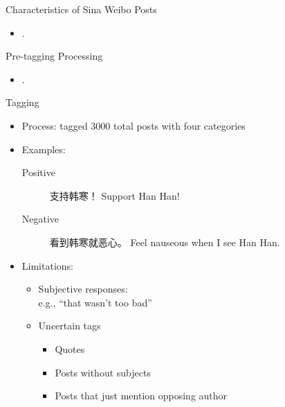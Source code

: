 \documentclass[12pt, trans]{beamer}
\newcommand{\1}[1]{{\mathbf 1}\left\{#1\right\}}        %
\begin{document}
\begin{frame}{Characteristics of Sina Weibo Posts}


\begin{itemize}[<+->]
\item  .
\end{itemize}

\end{frame}

\begin{frame}{Pre-tagging Processing}

\begin{itemize}[<+->]
\item  .
\end{itemize}

\end{frame}


\begin{frame}{Tagging}

\begin{itemize}[<+->]
\item  Process: tagged 3000 total posts with four categories
\item Examples:
	\begin{description}
	\item[Positive] 支持韩寒！ Support Han Han!
	\item[Negative] 看到韩寒就恶心。 Feel nauseous when I see Han Han.
	\end{description}


\item Limitations:
	
	\begin{itemize}
	\item Subjective responses:\\
		\quad e.g., ``that wasn't too bad''
	\item 	Uncertain tags
		\begin{itemize}
		\item Quotes
		\item Posts without subjects
		\item Posts that just mention opposing author
		\end{itemize}
	\end{itemize}

\end{itemize}

\end{frame}
\end{document}
